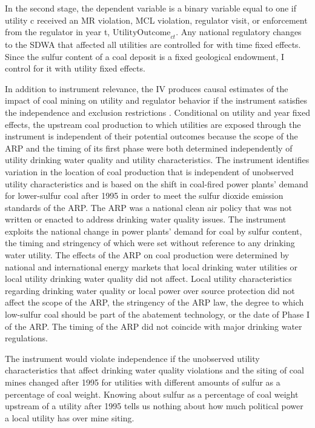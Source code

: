 \documentclass[12pt]{article}
\begin{document}
In the second stage, the dependent variable is a binary variable equal to one if utility c received an MR violation, MCL violation, regulator visit, or enforcement from the regulator in year t, $\text{UtilityOutcome}_{ct}$. Any national regulatory changes to the SDWA that affected all utilities are controlled for with time fixed effects. Since the sulfur content of a coal deposit is a fixed geological endowment, I control for it with utility fixed effects. 


In addition to instrument relevance, the IV produces causal estimates of the impact of coal mining on utility and regulator behavior if the instrument satisfies the independence and exclusion restrictions \parencite{angrist2009mostly}. Conditional on utility and year fixed effects, the upstream coal production to which utilities are exposed through the instrument is independent of their potential outcomes because the scope of the ARP and the timing of its first phase were both determined independently of utility drinking water quality and utility characteristics. The instrument identifies variation in the location of coal production that is independent of unobserved utility characteristics and is based on the shift in coal-fired power plants' demand for lower-sulfur coal after 1995 in order to meet the sulfur dioxide emission standards of the ARP. The ARP was a national clean air policy that was not written or enacted to address drinking water quality issues. The instrument exploits the national change in power plants' demand for coal by sulfur content, the timing and stringency of which were set without reference to any drinking water utility. The effects of the ARP on coal production were determined by national and international energy markets that local drinking water utilities or local utility drinking water quality did not affect. Local utility characteristics regarding drinking water quality or local power over source protection did not affect the scope of the ARP, the stringency of the ARP law, the degree to which low-sulfur coal should be part of the abatement technology, or the date of Phase I of the ARP. The timing of the ARP did not coincide with major drinking water regulations.

The instrument would violate independence if the unobserved utility characteristics that affect drinking water quality violations and the siting of coal mines changed after 1995 for utilities with different amounts of sulfur as a percentage of coal weight. Knowing about sulfur as a percentage of coal weight upstream of a utility after 1995 tells us nothing about how much political power a local utility has over mine siting.
\end{document}
